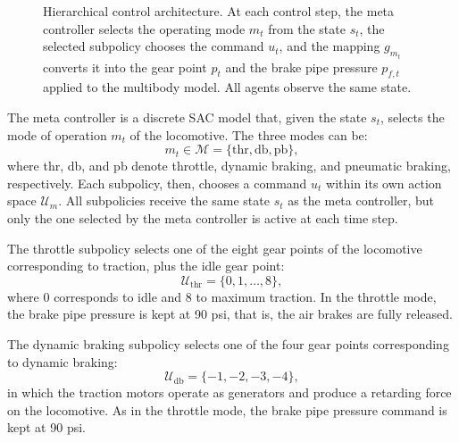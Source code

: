 \documentclass[preprint,10pt]{elsarticle}
\begin{document}
\begin{figure}[htbp]
    \caption{Hierarchical control architecture. At each control step, the meta controller selects the operating mode $m_t$ from the state $s_t$, the selected subpolicy chooses the command $u_t$, and the mapping $g_{m_t}$ converts it into the gear point $p_t$ and the brake pipe pressure $p_{f,t}$ applied to the multibody model. All agents observe the same state.}
    \label{fig:architecture}
\end{figure}

The meta controller is a discrete SAC model that, given the state $s_t$, selects the mode of operation $m_t$ of the locomotive. The three modes can be:
\begin{equation}
    m_t \in \mathcal{M} = \{\text{thr}, \text{db}, \text{pb}\},
    \label{eq:modes}
\end{equation}
where thr, db, and pb denote throttle, dynamic braking, and pneumatic braking, respectively. Each subpolicy, then, chooses a command $u_t$ within its own action space $\mathcal{U}_m$. All subpolicies receive the same state $s_t$ as the meta controller, but only the one selected by the meta controller is active at each time step.

The throttle subpolicy selects one of the eight gear points of the locomotive corresponding to traction, plus the idle gear point:
\begin{equation}
    \mathcal{U}_{\text{thr}} = \{0, 1, \dots, 8\},
\end{equation}
where 0 corresponds to idle and 8 to maximum traction. In the throttle mode, the brake pipe pressure is kept at 90 psi, that is, the air brakes are fully released.

The dynamic braking subpolicy selects one of the four gear points corresponding to dynamic braking:
\begin{equation}
    \mathcal{U}_{\text{db}} = \{-1, -2, -3, -4\},
\end{equation}
in which the traction motors operate as generators and produce a retarding force on the locomotive. As in the throttle mode, the brake pipe pressure command is kept at 90 psi.
\end{document}
